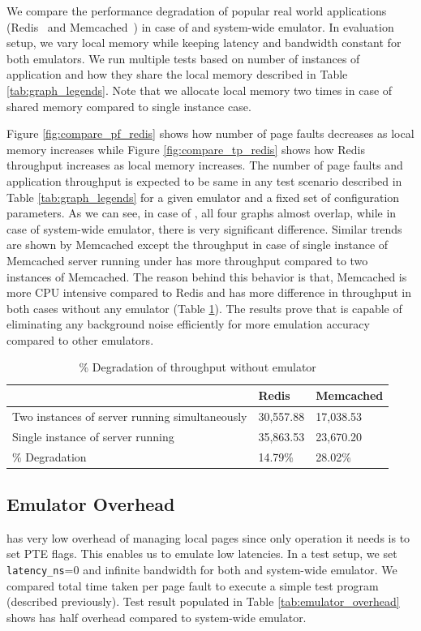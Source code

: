 We compare the performance degradation of popular real world applications (Redis~\cite{redis} and Memcached~\cite{memcached}) in case of {\dime} and system-wide emulator\cite{Gao}. In evaluation setup, we vary local memory while keeping latency and bandwidth constant for both emulators. We run multiple tests based on number of instances of application and how they share the local memory described in Table \ref{tab:graph_legends}. Note that we allocate local memory two times in case of shared memory compared to single instance case. 

Figure \ref{fig:compare_pf_redis} shows how number of page faults decreases as local memory increases while Figure \ref{fig:compare_tp_redis} shows how Redis throughput increases as local memory increases. The number of page faults and application throughput is expected to be same in any test scenario described in Table \ref{tab:graph_legends} for a given emulator and a fixed set of configuration parameters. As we can see, in case of {\dime}, all four graphs almost overlap, while in case of system-wide emulator, there is very significant difference. Similar trends are shown by Memcached except the throughput in case of single instance of Memcached server running under {\dime} has more throughput compared to two instances of Memcached. The reason behind this behavior is that, Memcached is more CPU intensive compared to Redis and has more difference in throughput in both cases without any emulator (Table \ref{tab:deg_without_emulator}). The results prove that {\dime} is capable of eliminating any background noise efficiently for more emulation accuracy compared to other emulators. 

\begin{table}[]
	\centering
	\caption{\% Degradation of throughput without emulator}
	\label{tab:deg_without_emulator}
	\begin{tabular}{l|ll}
		\hline
		& Redis & Memcached \\ \hline
		Two instances of server running simultaneously & 30,557.88 & 17,038.53 \\
		Single instance of server running & 35,863.53 & 23,670.20 \\ \hline
		\% Degradation & 14.79\% & 28.02\% \\ \hline
	\end{tabular}
\end{table}

\subsection{Emulator Overhead}
{\dime} has very low overhead of managing local pages since only operation it needs is to set PTE flags. This enables us to emulate low latencies. In a test setup, we set \verb|latency_ns|=0 and infinite bandwidth for both {\dime} and system-wide emulator. We compared total time taken per page fault to execute a simple test program (described previously). Test result populated in Table \ref{tab:emulator_overhead} shows {\dime} has half overhead compared to system-wide emulator.

